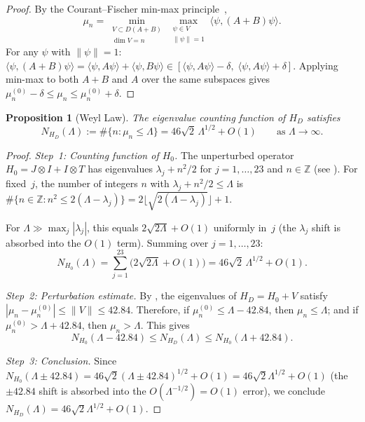 \documentclass[11pt,a4paper]{article}
\theoremstyle{plain}
\newtheorem{proposition}[theorem]{Proposition}
\theoremstyle{remark}
\newcommand{\Z}{\mathbb{Z}}
\newcommand{\norm}[1]{\lVert #1 \rVert}
\begin{document}
\begin{proof}
By the Courant--Fischer min-max principle~\cite[Thm.~XIII.1]{reed-simon1978},
\[
  \mu_n=\min_{\substack{V\subset D(A+B)\\\dim V=n}}
  \max_{\substack{\psi\in V\\\norm{\psi}=1}}\langle\psi,(A+B)\psi\rangle.
\]
For any $\psi$ with $\norm{\psi}=1$:
$\langle\psi,(A+B)\psi\rangle=\langle\psi,A\psi\rangle+\langle\psi,B\psi\rangle
\in[\langle\psi,A\psi\rangle-\delta,\;\langle\psi,A\psi\rangle+\delta]$.
Applying min-max to both $A+B$ and $A$ over the same subspaces gives
$\mu_n^{(0)}-\delta\leq\mu_n\leq\mu_n^{(0)}+\delta$.
\end{proof}

\begin{proposition}[Weyl Law]\label{prop:weyl}
The eigenvalue counting function of $H_D$ satisfies
\begin{equation}\label{eq:weyl}
  N_{H_D}(\Lambda):=\#\{n:\mu_n\leq\Lambda\}
  =46\sqrt{2}\,\Lambda^{1/2}+O(1)
  \qquad\text{as }\Lambda\to\infty.
\end{equation}
\end{proposition}

\begin{proof}
\emph{Step~1: Counting function of $H_0$.}
The unperturbed operator $H_0=J\otimes I+I\otimes T$ has eigenvalues
$\lambda_j+n^2/2$ for $j=1,\ldots,23$ and $n\in\Z$ (see ).
For fixed~$j$, the number of integers $n$ with
$\lambda_j+n^2/2\leq\Lambda$ is
$\#\{n\in\Z:n^2\leq 2(\Lambda-\lambda_j)\}
=2\lfloor\sqrt{2(\Lambda-\lambda_j)}\rfloor+1$.

For $\Lambda\gg\max_j|\lambda_j|$, this equals
$2\sqrt{2\Lambda}+O(1)$ uniformly in~$j$ (the $\lambda_j$ shift is
absorbed into the $O(1)$ term).  Summing over $j=1,\ldots,23$:
\begin{equation}\label{eq:weyl-H0}
  N_{H_0}(\Lambda)=\sum_{j=1}^{23}\bigl(2\sqrt{2\Lambda}+O(1)\bigr)
  =46\sqrt{2}\,\Lambda^{1/2}+O(1).
\end{equation}

\emph{Step~2: Perturbation estimate.}
By , the eigenvalues of $H_D=H_0+V$ satisfy
$|\mu_n-\mu_n^{(0)}|\leq\norm{V}\leq 42.84$.  Therefore, if
$\mu_n^{(0)}\leq\Lambda-42.84$, then $\mu_n\leq\Lambda$; and if
$\mu_n^{(0)}>\Lambda+42.84$, then $\mu_n>\Lambda$.  This gives
\[
  N_{H_0}(\Lambda-42.84)\leq N_{H_D}(\Lambda)\leq N_{H_0}(\Lambda+42.84).
\]

\emph{Step~3: Conclusion.}
Since $N_{H_0}(\Lambda\pm 42.84)=46\sqrt{2}(\Lambda\pm 42.84)^{1/2}+O(1)
=46\sqrt{2}\Lambda^{1/2}+O(1)$
(the $\pm 42.84$ shift is absorbed into the $O(\Lambda^{-1/2})=O(1)$ error),
we conclude $N_{H_D}(\Lambda)=46\sqrt{2}\Lambda^{1/2}+O(1)$.
\end{proof}
\end{document}
